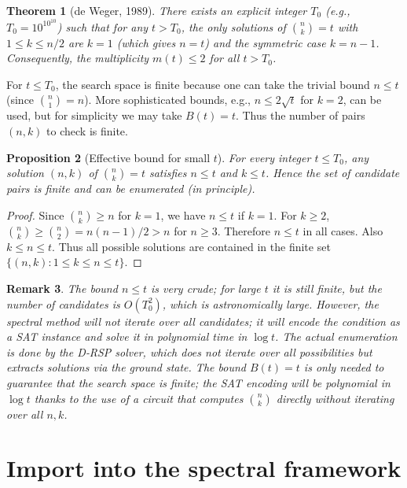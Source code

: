 \documentclass[11pt,a4paper]{article}
\newtheorem{theorem}{Theorem}[section]
\newtheorem{proposition}[theorem]{Proposition}
\newtheorem{remark}[theorem]{Remark}
\begin{document}
\begin{theorem}[de Weger, 1989]
\label{thm:deweger}
There exists an explicit integer \(T_0\) (e.g., \(T_0 = 10^{10^{10}}\)) such that for any \(t > T_0\), the only solutions of \(\binom{n}{k}=t\) with \(1\le k\le n/2\) are \(k=1\) (which gives \(n=t\)) and the symmetric case \(k=n-1\). Consequently, the multiplicity \(m(t) \le 2\) for all \(t > T_0\).
\end{theorem}

For \(t \le T_0\), the search space is finite because one can take the trivial bound \(n \le t\) (since \(\binom{n}{1}=n\)). More sophisticated bounds, e.g., \(n \le 2\sqrt{t}\) for \(k=2\), can be used, but for simplicity we may take \(B(t)=t\). Thus the number of pairs \((n,k)\) to check is finite.

\begin{proposition}[Effective bound for small \(t\)]
\label{prop:small}
For every integer \(t \le T_0\), any solution \((n,k)\) of \(\binom{n}{k}=t\) satisfies \(n \le t\) and \(k \le t\). Hence the set of candidate pairs is finite and can be enumerated (in principle).
\end{proposition}
\begin{proof}
Since \(\binom{n}{k} \ge n\) for \(k=1\), we have \(n \le t\) if \(k=1\). For \(k\ge 2\), \(\binom{n}{k} \ge \binom{n}{2} = n(n-1)/2 > n\) for \(n\ge 3\). Therefore \(n \le t\) in all cases. Also \(k \le n \le t\). Thus all possible solutions are contained in the finite set \(\{(n,k): 1\le k\le n\le t\}\).
\end{proof}

\begin{remark}
The bound \(n \le t\) is very crude; for large \(t\) it is still finite, but the number of candidates is \(O(T_0^2)\), which is astronomically large. However, the spectral method will not iterate over all candidates; it will encode the condition as a SAT instance and solve it in polynomial time in \(\log t\). The actual enumeration is done by the D‑RSP solver, which does not iterate over all possibilities but extracts solutions via the ground state. The bound \(B(t)=t\) is only needed to guarantee that the search space is finite; the SAT encoding will be polynomial in \(\log t\) thanks to the use of a circuit that computes \(\binom{n}{k}\) directly without iterating over all \(n,k\).
\end{remark}

\section{Import into the spectral framework}
\end{document}

